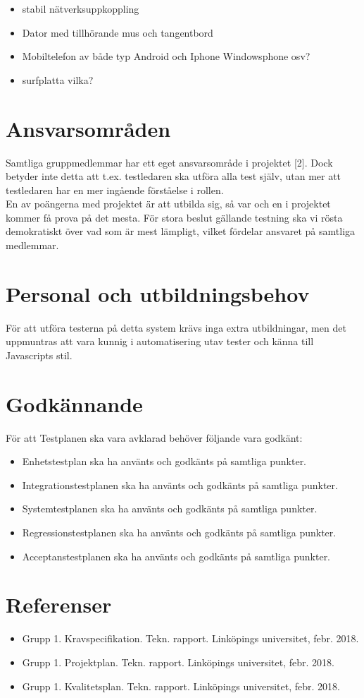 \documentclass[10pt]{article}
\begin{document}
	\begin{itemize}
	\item stabil nätverksuppkoppling
	\item Dator med tillhörande mus och tangentbord
	\item Mobiltelefon av både typ Android och Iphone {\color{red}Windowsphone osv?}
	\item surfplatta {\color{red}vilka?}
	\end{itemize}

\section{Ansvarsområden}
	Samtliga gruppmedlemmar har ett eget ansvarsområde i projektet {\color{red}[2]}. Dock betyder inte detta att t.ex. testledaren ska utföra alla test själv, utan mer att testledaren har en mer ingående förståelse i rollen. \\
	En av poängerna med projektet är att utbilda sig, så var och en i projektet kommer få prova på det mesta. För stora beslut gällande testning ska vi rösta demokratiskt över vad som är mest lämpligt, vilket fördelar ansvaret på samtliga medlemmar.
	

\section{Personal och utbildningsbehov}
	För att utföra testerna på detta system krävs inga extra utbildningar, men det uppmuntras att vara kunnig i automatisering utav tester och känna till Javascripts stil.

	
	
\section{Godkännande}
	För att Testplanen ska vara avklarad behöver följande vara godkänt:
	\begin{itemize}
	 \item Enhetstestplan ska ha använts och godkänts på samtliga punkter.
	 \item Integrationstestplanen ska ha använts och godkänts på samtliga punkter.
	 \item Systemtestplanen ska ha använts och godkänts på samtliga punkter.
	 \item Regressionstestplanen ska ha använts och godkänts på samtliga punkter.
	 \item Acceptanstestplanen ska ha använts och godkänts på samtliga punkter.
	\end{itemize}
	

\section{Referenser}
	\begin{itemize}
	\item [1] Grupp 1. Kravspecifikation. Tekn. rapport. Linköpings universitet, febr. 2018.
	\item [2] Grupp 1. Projektplan. Tekn. rapport. Linköpings universitet, febr. 2018.
	\item [3] Grupp 1. Kvalitetsplan. Tekn. rapport. Linköpings universitet, febr. 2018.
	\end{itemize}
	
\end{document}
